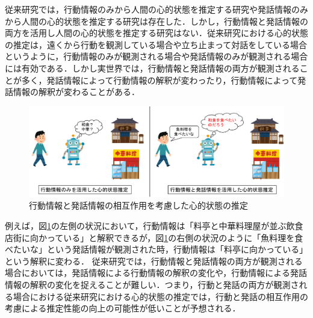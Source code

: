 \par
従来研究では，行動情報のみから人間の心的状態を推定する研究や発話情報のみから人間の心的状態を推定する研究は存在した．しかし，行動情報と発話情報の両方を活用し人間の心的状態を推定する研究はない．従来研究における心的状態の推定は，遠くから行動を観測している場合や立ち止まって対話をしている場合というように，行動情報のみが観測される場合や発話情報のみが観測される場合には有効である．しかし実世界では，行動情報と発話情報の両方が観測されることが多く，発話情報によって行動情報の解釈が変わったり，行動情報によって発話情報の解釈が変わることがある．
\begin{figure}[htbp]
  \begin{center}
    \includegraphics[scale=0.5]{./figure1.pdf}
    \caption{行動情報と発話情報の相互作用を考慮した心的状態の推定}
    \label{fig:fig1}
  \end{center}
\end{figure}
例えば，図\ref{fig:fig1}の左側の状況において，行動情報は「料亭と中華料理屋が並ぶ飲食店街に向かっている」と解釈できるが，図\ref{fig:fig1}の右側の状況のように「魚料理を食べたいな」という発話情報が観測された時，行動情報は「料亭に向かっている」という解釈に変わる．
従来研究では，行動情報と発話情報の両方が観測される場合においては，発話情報による行動情報の解釈の変化や，行動情報による発話情報の解釈の変化を捉えることが難しい．つまり，行動と発話の両方が観測される場合における従来研究における心的状態の推定では，行動と発話の相互作用の考慮による推定性能の向上の可能性が低いことが予想される．
